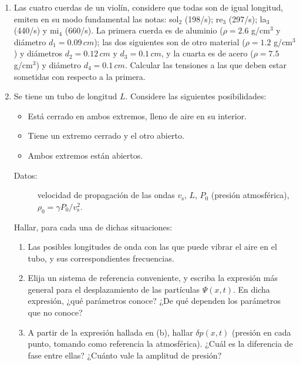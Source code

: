 \documentclass[11pt,spanish]{article}
\begin{document}
\begin{enumerate}

    \item Las cuatro cuerdas de un violín, considere que todas son de igual
    longitud, emiten en su modo fundamental las notas: sol$_{\text{2}}$ (198/s);
    re$_{\text{3}}$ (297/s); la$_{\text{3}}$ (440/s) y mi$_{\text{4}}$ (660/s).
    La primera cuerda es de aluminio ($\rho=2.6$ g/cm$^{3}$ y diámetro
    $d_{1}=0.09\unit{\, cm}$); las dos siguientes son de otro material
    ($\rho=1.2$ g/cm$^{3}$) y diámetros $d_{2}=0.12\unit{\, cm}$ y
    $d_{3}=0.1\unit{\, cm}$, y la cuarta es de acero ($\rho=7.5$ g/cm$^{3}$) y
    diámetro $d_{4}=0.1\unit{\, cm}$. Calcular las tensiones a las
    que deben estar sometidas con respecto a la primera.


    \item Se tiene un tubo de longitud $L$. Considere las siguientes
    posibilidades: 

    \begin{itemize}
        \item Está cerrado en ambos extremos, lleno de aire en su interior.
        \item Tiene un extremo cerrado y el otro abierto. 
        \item Ambos extremos están abiertos.
    \end{itemize}

    \begin{description}
        \item [{Datos:}] velocidad de propagación de las ondas $v_\text{s}$, $L$,
        $P_{0}$ (presión atmosférica), $\rho_{0}=\gamma P_{0}/v_\text{s}^{2}$.
    \end{description}

    Hallar, para cada una de dichas situaciones: 

    \begin{enumerate}
        \item Las posibles longitudes de onda con las que puede vibrar el aire
        en el tubo, y sus correspondientes frecuencias.

        \item Elija un sistema de referencia conveniente, y escriba la expresión
        más general para el desplazamiento de las partículas $\Psi(x,t)$. En
        dicha expresión, ¿qué parámetros conoce? ¿De qué dependen los parámetros
        que no conoce?

        \item A partir de la expresión hallada en (b), hallar $\delta p(x,t)$
        (presión en cada punto, tomando como referencia la atmosférica). ¿Cuál
        es la diferencia de fase entre ellas? ¿Cuánto vale la amplitud de
        presión?


\end{enumerate}
\end{enumerate}
\end{document}

